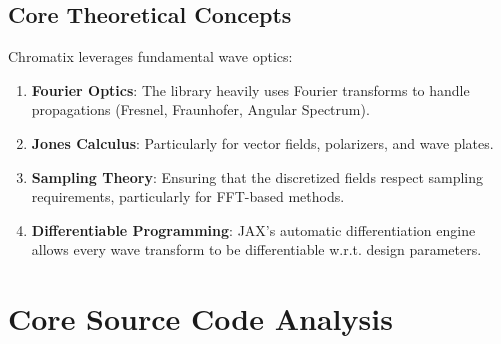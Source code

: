 \documentclass[a4paper,12pt]{report}
\begin{document}
\section{Core Theoretical Concepts}
Chromatix leverages fundamental wave optics:
\begin{enumerate}
    \item \textbf{Fourier Optics}: The library heavily uses Fourier transforms to handle propagations (Fresnel, Fraunhofer, Angular Spectrum).
    \item \textbf{Jones Calculus}: Particularly for vector fields, polarizers, and wave plates.
    \item \textbf{Sampling Theory}: Ensuring that the discretized fields respect sampling requirements, particularly for FFT-based methods.
    \item \textbf{Differentiable Programming}: JAX's automatic differentiation engine allows every wave transform to be differentiable w.r.t. design parameters.
\end{enumerate}

\chapter{Core Source Code Analysis}
\end{document}
